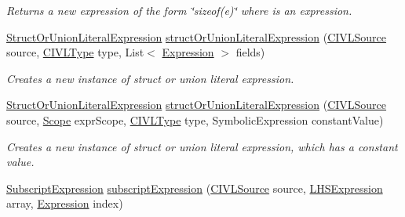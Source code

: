 \begin{DoxyCompactItemize}
\begin{DoxyCompactList}\small\item\em Returns a new expression of the form \char`\"{}sizeof(e)\char`\"{} where is an expression. \end{DoxyCompactList}\item 
\hyperlink{interfaceedu_1_1udel_1_1cis_1_1vsl_1_1civl_1_1model_1_1IF_1_1expression_1_1StructOrUnionLiteralExpression}{Struct\+Or\+Union\+Literal\+Expression} \hyperlink{interfaceedu_1_1udel_1_1cis_1_1vsl_1_1civl_1_1model_1_1IF_1_1ModelFactory_a458a084f1bcf8d88f70c0cb8080f8a77}{struct\+Or\+Union\+Literal\+Expression} (\hyperlink{interfaceedu_1_1udel_1_1cis_1_1vsl_1_1civl_1_1model_1_1IF_1_1CIVLSource}{C\+I\+V\+L\+Source} source, \hyperlink{interfaceedu_1_1udel_1_1cis_1_1vsl_1_1civl_1_1model_1_1IF_1_1type_1_1CIVLType}{C\+I\+V\+L\+Type} type, List$<$ \hyperlink{interfaceedu_1_1udel_1_1cis_1_1vsl_1_1civl_1_1model_1_1IF_1_1expression_1_1Expression}{Expression} $>$ fields)
\begin{DoxyCompactList}\small\item\em Creates a new instance of struct or union literal expression. \end{DoxyCompactList}\item 
\hyperlink{interfaceedu_1_1udel_1_1cis_1_1vsl_1_1civl_1_1model_1_1IF_1_1expression_1_1StructOrUnionLiteralExpression}{Struct\+Or\+Union\+Literal\+Expression} \hyperlink{interfaceedu_1_1udel_1_1cis_1_1vsl_1_1civl_1_1model_1_1IF_1_1ModelFactory_a69b61b0fb5051213635fb249825cce45}{struct\+Or\+Union\+Literal\+Expression} (\hyperlink{interfaceedu_1_1udel_1_1cis_1_1vsl_1_1civl_1_1model_1_1IF_1_1CIVLSource}{C\+I\+V\+L\+Source} source, \hyperlink{interfaceedu_1_1udel_1_1cis_1_1vsl_1_1civl_1_1model_1_1IF_1_1Scope}{Scope} expr\+Scope, \hyperlink{interfaceedu_1_1udel_1_1cis_1_1vsl_1_1civl_1_1model_1_1IF_1_1type_1_1CIVLType}{C\+I\+V\+L\+Type} type, Symbolic\+Expression constant\+Value)
\begin{DoxyCompactList}\small\item\em Creates a new instance of struct or union literal expression, which has a constant value. \end{DoxyCompactList}\item 
\hyperlink{interfaceedu_1_1udel_1_1cis_1_1vsl_1_1civl_1_1model_1_1IF_1_1expression_1_1SubscriptExpression}{Subscript\+Expression} \hyperlink{interfaceedu_1_1udel_1_1cis_1_1vsl_1_1civl_1_1model_1_1IF_1_1ModelFactory_a63fe49c9fea247a886d1dd9878185a08}{subscript\+Expression} (\hyperlink{interfaceedu_1_1udel_1_1cis_1_1vsl_1_1civl_1_1model_1_1IF_1_1CIVLSource}{C\+I\+V\+L\+Source} source, \hyperlink{interfaceedu_1_1udel_1_1cis_1_1vsl_1_1civl_1_1model_1_1IF_1_1expression_1_1LHSExpression}{L\+H\+S\+Expression} array, \hyperlink{interfaceedu_1_1udel_1_1cis_1_1vsl_1_1civl_1_1model_1_1IF_1_1expression_1_1Expression}{Expression} index)

\end{DoxyCompactItemize}
